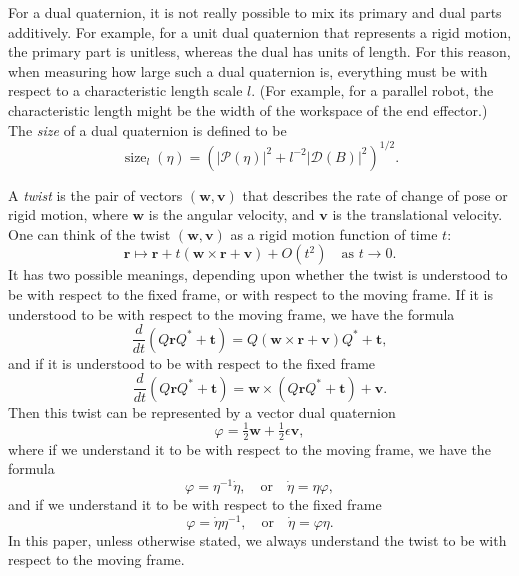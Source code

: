 \documentclass[reqno,12pt]{amsart}
\DeclareMathOperator\size{{size}}
\begin{document}
For a dual quaternion, it is not really possible to mix its primary and dual parts additively.  For example, for a unit dual quaternion that represents a rigid motion, the primary part is unitless, whereas the dual has units of length.  For this reason, when measuring how large such a dual quaternion is, everything must be with respect to a characteristic length scale $l$.  (For example, for a parallel robot, the characteristic length might be the width of the workspace of the end effector.)  The \emph{size} of a dual quaternion is defined to be
\begin{equation}
\label{size}
\size_{l}(\eta) = \left(|\mathcal P(\eta)|^2 + l^{-2}|\mathcal D(B)|^2\right)^{1/2}.
\end{equation}

A \emph{twist} is the pair of vectors $(\bm w, \bm v)$ that describes the rate of change of pose or rigid motion, where $\bm w$ is the angular velocity, and $\bm v$ is the translational velocity.  One can think of the twist $(\bm w, \bm v)$ as a rigid motion function of time $t$:
\begin{equation}
\bm r \mapsto \bm r + t (\bm w \times \bm r + \bm v) + O(t^2) \quad \text{as $t \to 0$} .
\end{equation}
It has two possible meanings, depending upon whether the twist is understood to be with respect to the fixed frame, or with respect to the moving frame.  If it is understood to be with respect to the moving frame, we have the formula
\begin{equation}
\label{ode twist}
\frac d{dt} (Q \bm r Q^* + \bm t) = Q (\bm w \times \bm r + \bm v) Q^* + \bm t,
\end{equation}
and if it is understood to be with respect to the fixed frame
\begin{equation}
\label{ode twist fixed}
\frac d{dt} (Q \bm r Q^* + \bm t) = \bm w \times (Q \bm r Q^* + \bm t) + \bm v .
\end{equation}
Then this twist can be represented by a vector dual quaternion \cite{adorno, agrawal}
\begin{equation}
\label{twist as dual quaternion}
\varphi = \tfrac12 \bm w + \tfrac12 \epsilon \bm v ,
\end{equation}
where if we understand it to be with respect to the moving frame, we have the formula
\begin{equation}
\label{ode dual quaternion}
\varphi = \eta^{-1} \dot \eta, \quad\text{or}\quad\dot \eta = \eta \varphi ,
\end{equation}
and if we understand it to be with respect to the fixed frame
\begin{equation}
\label{ode dual quaternion fixed}
\varphi = \dot \eta \eta^{-1}, \quad\text{or}\quad\dot \eta = \varphi \eta .
\end{equation}
In this paper, unless otherwise stated, we always understand the twist to be with respect to the moving frame.
\end{document}
